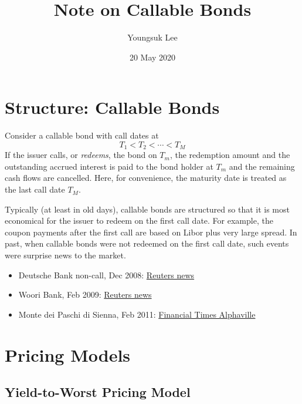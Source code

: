 \documentclass[10pt,a4paper]{article}
\begin{document}
\title{Note on Callable Bonds}
\author{Youngsuk Lee}
\date{20 May 2020}
\maketitle

\section{Structure: Callable Bonds}

Consider a callable bond with call dates at
\begin{equation}
T_1 < T_2 < \cdots < T_M
\end{equation}
If the issuer calls, or {\em redeems}, the bond on $T_m$, the redemption amount and the outstanding accrued interest is paid to the bond holder at $T_m$ and the remaining cash flows are cancelled. Here, for convenience, the maturity date is treated as the last call date $T_M$. 


Typically (at least in old days), callable bonds are structured so that it is most economical for the issuer to redeem on the first call date. For example, the coupon payments after the first call are based on Libor plus very large spread. In past, when callable bonds were not redeemed on the first call date, such events were surprise news to the market. 
\begin{itemize}
	\item Deutsche Bank non-call, Dec 2008: \href{https://in.reuters.com/article/deutsche-bank-bond-call/update-2-deutsche-bank-non-call-casts-shadow-over-lt2-bonds-idINLH25709820081217}{Reuters news}
	\item Woori Bank, Feb 2009: \href{https://www.reuters.com/article/woori-bonds/asia-credit-woori-bank-seen-calling-back-400-mln-of-debt-idUSHKG35800620090209}{Reuters news}
	\item Monte dei Paschi di Sienna, Feb 2011:
	\href{https://ftalphaville.ft.com/2011/02/17/491236/another-bank-non-call-an-entirely-different-reaction/}{Financial Times Alphaville}
\end{itemize}

\section{Pricing Models}

\subsection{Yield-to-Worst Pricing Model}
\label{sec:pricing-model-yield-to-worst}
\end{document}
